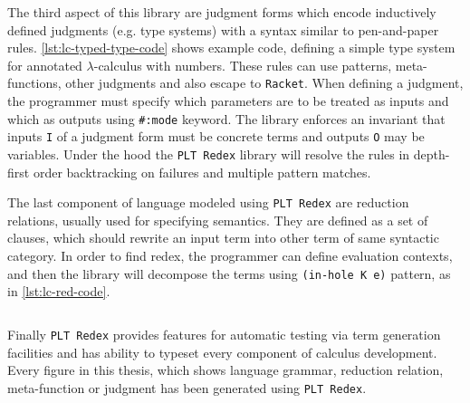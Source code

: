 \documentclass[inz, english, shortabstract]{iithesis}
\newcommand{\Redex}{\texttt{PLT Redex}}
\newcommand{\Racket}{\texttt{Racket}}
\newcommand{\LC}{\(\lambda\)-calculus}
\begin{document}
\begin{listing}[H]
  \inputminted[firstline=34,lastline=51]{Racket}{../lc/lc.rkt}
  \caption{Type system for \LC{} in \Redex{}}
  \label{lst:lc-typed-type-code}
\end{listing}

The third aspect of this library are judgment forms which encode inductively defined judgments (e.g. type systems) with a syntax similar to pen-and-paper rules. \autoref{lst:lc-typed-type-code} shows example code, defining a simple type system for annotated \LC{} with numbers.
These rules can use patterns, meta-functions, other judgments and also escape to \Racket{}.
When defining a judgment, the programmer must specify which parameters are to be treated as inputs and which as outputs using \texttt{#:mode} keyword.
The library enforces an invariant that inputs \texttt{I} of a judgment form must be concrete terms and outputs \texttt{O} may be variables.
Under the hood the \Redex{} library will resolve the rules in depth-first order backtracking on failures and multiple pattern matches.

The last component of language modeled using \Redex{} are reduction relations, usually used for specifying semantics.
They are defined as a set of clauses, which should rewrite an input term into other term of same syntactic category.
In order to find redex, the programmer can define evaluation contexts, and then the library will decompose the terms using \texttt{(in-hole K e)} pattern, as in \autoref{lst:lc-red-code}.

\begin{listing}[H]
  \inputminted[firstline=19,lastline=23]{Racket}{../lc/lc.rkt}
  \caption{Reduction relation for \LC{} in \Redex{}}
  \label{lst:lc-red-code}
\end{listing}

Finally \Redex{} provides features for automatic testing via term generation facilities and has ability to typeset every component of calculus development.
Every figure in this thesis, which shows language grammar, reduction relation, meta-function or judgment has been generated using \Redex{}.
\end{document}
